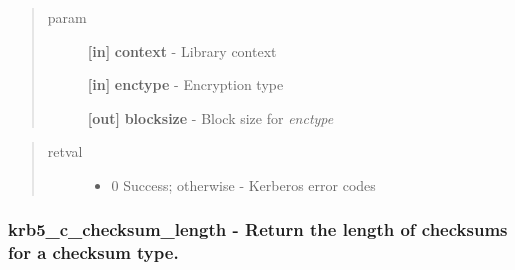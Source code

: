 \documentclass[letterpaper,10pt,english]{sphinxmanual}
\begin{document}
\begin{quote}\begin{description}
\item[{param}] \leavevmode
\textbf{{[}in{]}} \textbf{context} - Library context

\textbf{{[}in{]}} \textbf{enctype} - Encryption type

\textbf{{[}out{]}} \textbf{blocksize} - Block size for \emph{enctype}

\end{description}\end{quote}
\begin{quote}\begin{description}
\item[{retval}] \leavevmode\begin{itemize}
\item {} 
0   Success; otherwise - Kerberos error codes

\end{itemize}

\end{description}\end{quote}


\subsubsection{krb5\_c\_checksum\_length -  Return the length of checksums for a checksum type.}
\label{appdev/refs/api/krb5_c_checksum_length:krb5-c-checksum-length-return-the-length-of-checksums-for-a-checksum-type}\label{appdev/refs/api/krb5_c_checksum_length::doc}

\begin{fulllineitems}
\label{appdev/refs/api/krb5_c_checksum_length:c.krb5_c_checksum_length}
\end{fulllineitems}
\end{document}
